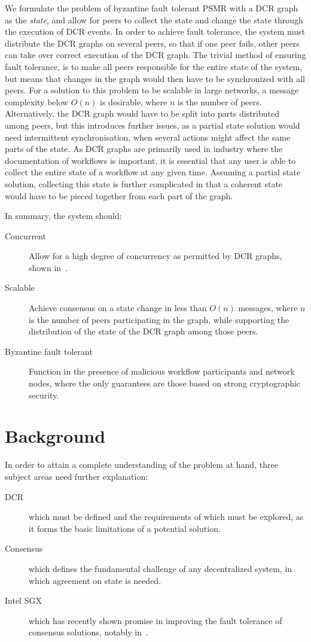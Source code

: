\documentclass{article}
\begin{document}
	We formulate the problem of byzantine fault tolerant PSMR with a DCR graph as the \textit{state}, and allow for peers to collect the state and change the state through the execution of DCR events.
	In order to achieve fault tolerance, the system must distribute the DCR graphs on several peers, so that if one peer fails, other peers can take over correct execution of the DCR graph.
	The trivial method of ensuring fault tolerance, is to make all peers responsible for the entire state of the system, but means that changes in the graph would then have to be synchronized with all peers.
	For a solution to this problem to be scalable in large networks, a message complexity below $O(n)$ is desirable, where $n$ is the number of peers.
	Alternatively, the DCR graph would have to be split into parts distributed among peers, but this introduces further issues, as a partial state solution would need intermittent synchronisation, when several actions might affect the same parts of the state.
	As DCR graphs are primarily used in industry where the documentation of workflows is important, it is essential that any user is able to collect the entire state of a workflow at any given time.
	Assuming a partial state solution, collecting this state is further complicated in that a coherent state would have to be pieced together from each part of the graph.

	In summary, the system should:
	\begin{description}
		\item[Concurrent] Allow for a high degree of concurrency as permitted by DCR graphs, shown in~\cite{debois_concurrency_2015}.
		\item[Scalable] Achieve consensus on a state change in less than $O(n)$ messages, where $n$ is the number of peers participating in the graph, while supporting the distribution of the state of the DCR graph among those peers.
		\item[Byzantine fault tolerant] Function in the presence of malicious workflow participants and network nodes, where the only guarantees are those based on strong cryptographic security.
	\end{description}

\section{Background}

In order to attain a complete understanding of the problem at hand, three subject areas need further explanation:
\begin{description}
	\item[DCR] which must be defined and the requirements of which must be explored, as it forms the basic limitations of a potential solution.
	\item[Consensus] which defines the fundamental challenge of any decentralized system, in which agreement on state is needed.
	\item[Intel SGX] which has recently shown promise in improving the fault tolerance of consensus solutions, notably in~\cite{kapitza_cheapbft_2012,veronese_efficient_2013,liu_scalable_2016}.
\end{description}
\end{document}
